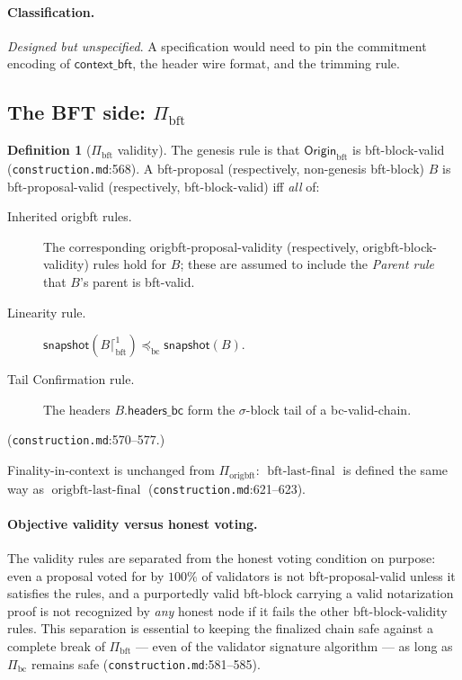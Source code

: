 \documentclass[11pt,a4paper]{article}
\theoremstyle{definition}
\newtheorem{definition}[theorem]{Definition}
\begin{document}
\paragraph{Classification.} \emph{Designed but unspecified}. A
specification would need to pin the commitment encoding of
$\mathsf{context\_bft}$, the header wire format, and the trimming rule.

\subsection{The BFT side: $\Pi_{\mathrm{bft}}$}\label{sec:xl-bft}

\begin{definition}[$\Pi_{\mathrm{bft}}$ validity]\label{def:xl-bft-validity}
The genesis rule is that $\mathsf{Origin}_{\mathrm{bft}}$ is
bft-block-valid (\texttt{construction.md}:568). A bft-proposal
(respectively, non-genesis bft-block) $B$ is bft-proposal-valid
(respectively, bft-block-valid) iff \emph{all} of:
\begin{description}
\item[Inherited origbft rules.] The corresponding
  origbft-proposal-validity (respectively, origbft-block-validity) rules
  hold for $B$; these are assumed to include the \emph{Parent rule} that
  $B$'s parent is bft-valid.
\item[Linearity rule.] $\mathsf{snapshot}(B \lceil^{1}_{\mathrm{bft}})
  \preceq_{\mathrm{bc}} \mathsf{snapshot}(B)$.
\item[Tail Confirmation rule.] The headers $B.\mathsf{headers\_bc}$ form
  the $\sigma$-block tail of a bc-valid-chain.
\end{description}
(\texttt{construction.md}:570--577.)
\end{definition}

Finality-in-context is unchanged from $\Pi_{\mathrm{origbft}}$:
$\operatorname{bft\text{-}last\text{-}final}$ is defined the same way as
$\operatorname{origbft\text{-}last\text{-}final}$
(\texttt{construction.md}:621--623).

\paragraph{Objective validity versus honest voting.} The validity rules
are separated from the honest voting condition on purpose: even a
proposal voted for by $100\%$ of validators is not bft-proposal-valid
unless it satisfies the rules, and a purportedly valid bft-block carrying
a valid notarization proof is not recognized by \emph{any} honest node if
it fails the other bft-block-validity rules. This separation is essential
to keeping the finalized chain safe against a complete break of
$\Pi_{\mathrm{bft}}$ --- even of the validator signature algorithm --- as
long as $\Pi_{\mathrm{bc}}$ remains safe
(\texttt{construction.md}:581--585).
\end{document}
